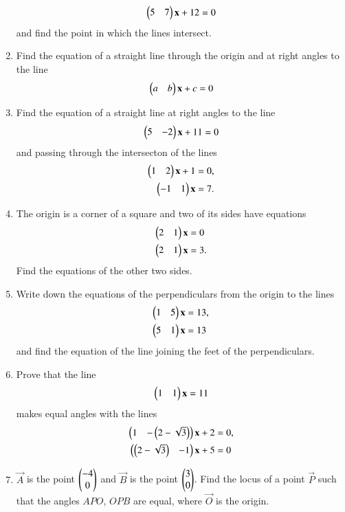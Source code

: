 \begin{enumerate}[label=\arabic*.,ref=\thesubsection.\theenumi]
\begin{align}
\begin{pmatrix}5 & 7\end{pmatrix}\mathbf{x}+12=0
\end{align}
 and find the point in
which the lines intersect.
\item Find the equation of a straight line through the origin and at right angles to the line
\begin{align}
\begin{pmatrix}a &b\end{pmatrix} \mathbf{x}+c= 0
\end{align}
\item Find the equation of a straight line at right angles to the line
\begin{align}
\begin{pmatrix}5 &-2\end{pmatrix}\mathbf{x}+11 = 0
\end{align}
and passing through the intersecton of the lines
\begin{align}
\begin{pmatrix}1 & 2\end{pmatrix}\mathbf{x}+1 &= 0,
\\
 \begin{pmatrix}-1 & 1\end{pmatrix} \mathbf{x}&= 7. 
\end{align}
\item The origin is a corner of a square and two of its sides have equations
\begin{align}
\begin{pmatrix}2 & 1\end{pmatrix} \mathbf{x}&= 0
\\
 \begin{pmatrix}2 & 1\end{pmatrix}\mathbf{x}&= 3.
\end{align}
Find the equations of the other two sides.
\item Write down the equations of the perpendiculars from the origin to the lines
\begin{align}
\begin{pmatrix}1 & 5\end{pmatrix} \mathbf{x}&= 13, 
\\
\begin{pmatrix}5 & 1\end{pmatrix} \mathbf{x}&= 13
\end{align}
and find the equation of the line joining the feet of the perpendiculars.
\item Prove that the line 
\begin{align}
\begin{pmatrix}1 & 1\end{pmatrix} \mathbf{x}= 11
\end{align}
 makes equal angles with the lines
\begin{align}
\begin{pmatrix}1 & -\left(2-\sqrt{3}\right)\end{pmatrix}\mathbf{x} + 2 &= 0,
\\
 \begin{pmatrix}\left(2-\sqrt{3}\right) &  - 1\end{pmatrix}\mathbf{x} + 5 &= 0
\end{align}
\renewcommand{\theequation}{\theenumi}
\item $\vec{A}$ is the point $\begin{pmatrix}-4\\0\end{pmatrix}$ and $\vec{B}$ is the point $\begin{pmatrix}3\\0\end{pmatrix}$.  Find the locus of a point $\vec{P}$ such that the angles $APO$, $OPB$ are equal, where $\vec{O}$ is the origin.
\end{enumerate}
